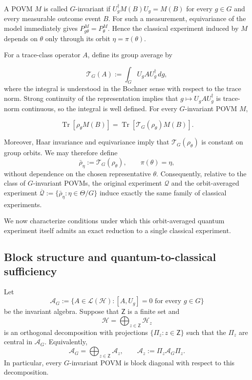 \documentclass{article}
\theoremstyle{named}
\theoremstyle{named1}
\newcommand{\Tr}{\operatorname{Tr}}
\newcommand{\cQ}{\mathcal Q}
\newcommand{\cA}{\mathcal A}
\newcommand{\cH}{\mathcal H}
\newcommand{\cT}{\mathcal{T}}
\theoremstyle{plain}
\theoremstyle{remark}
\begin{document}
A POVM \(M\) is called \(G\)-invariant if \(U_g^\dagger M(B)U_g=M(B)\) for every \(g\in G\) and every measurable outcome event \(B\). For such a measurement, equivariance of the model immediately gives \(P_{g\theta}^M=P_\theta^M\). Hence the classical experiment induced by \(M\) depends on \(\theta\) only through its orbit \(\eta=\pi(\theta)\).

For a trace-class operator \(A\), define its group average by

$$
    \cT_G(A):=\int_G U_gAU_g^\dagger\,dg,
$$
where the integral is understood in the Bochner sense with respect to the trace norm. Strong continuity of the representation implies that \(g\mapsto U_gAU_g^\dagger\) is trace-norm continuous, so the integral is well defined. For every \(G\)-invariant POVM \(M\),

$$
    \Tr\!\left[\rho_\theta M(B)\right]
    =
    \Tr\!\left[\cT_G(\rho_\theta)M(B)\right].
$$

Moreover, Haar invariance and equivariance imply that \(\cT_G(\rho_\theta)\) is constant on group orbits. We may therefore define
$$
    \bar\rho_\eta
    :=
    \cT_G(\rho_\theta),
    \qquad
    \pi(\theta)=\eta,
$$
without dependence on the chosen representative \(\theta\). Consequently, relative to the class of \(G\)-invariant POVMs, the original experiment \(\cQ\) and the orbit-averaged experiment \(\overline{\cQ}:=\{\bar\rho_\eta:\eta\in\Theta/G\}\) induce exactly the same family of classical experiments.

We now characterize conditions under which this orbit-averaged quantum experiment itself admits an exact reduction to a single classical experiment.

\subsection{Block structure and quantum-to-classical sufficiency}
\label{sec:invariant-factorization}

Let
\[
    \cA_G
    :=
    \{A\in\mathcal L(\cH):[A,U_g]=0
      \text{ for every }g\in G\}
\]
be the invariant algebra. Suppose that $\mathsf Z$ is a finite set and 
\[
    \cH
    =
    \bigoplus_{z\in\mathsf Z}\cH_z
\]
is an orthogonal decomposition with projections
$\{\Pi_z:z\in\mathsf Z\}$ such that the $\Pi_z$ are central in $\cA_G$.
Equivalently,
\[
    \cA_G
    =
    \bigoplus_{z\in\mathsf Z}\cA_z,
    \qquad
    \cA_z
    :=
    \Pi_z\cA_G\Pi_z.
\]
In particular, every $G$-invariant POVM is block diagonal with respect to this
decomposition.
\end{document}

